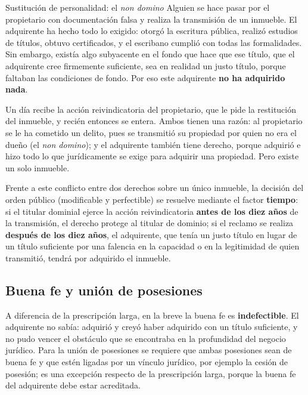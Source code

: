 \documentclass[12pt,oneside]{book}
\begin{document}
\begin{example}{Sustitución de personalidad: el \textit{non domino}}
Alguien se hace pasar por el propietario con documentación falsa y realiza la transmisión de un inmueble. El adquirente ha hecho todo lo exigido: otorgó la escritura pública, realizó estudios de títulos, obtuvo certificados, y el escribano cumplió con todas las formalidades. Sin embargo, existía algo subyacente en el fondo que hace que ese título, que el adquirente cree firmemente suficiente, sea en realidad un justo título, porque faltaban las condiciones de fondo. Por eso este adquirente \textbf{no ha adquirido nada}.

Un día recibe la acción reivindicatoria del propietario, que le pide la restitución del inmueble, y recién entonces se entera. Ambos tienen una razón: al propietario se le ha cometido un delito, pues se transmitió su propiedad por quien no era el dueño (el \textit{non domino}); y el adquirente también tiene derecho, porque adquirió e hizo todo lo que jurídicamente se exige para adquirir una propiedad. Pero existe un solo inmueble.
\end{example}

Frente a este conflicto entre dos derechos sobre un único inmueble, la decisión del orden público (modificable y perfectible) se resuelve mediante el factor \textbf{tiempo}: si el titular dominial ejerce la acción reivindicatoria \textbf{antes de los diez años} de la transmisión, el derecho protege al titular de dominio; si el reclamo se realiza \textbf{después de los diez años}, el adquirente, que tenía un justo título en lugar de un título suficiente por una falencia en la capacidad o en la legitimidad de quien transmitió, tendrá por adquirido el inmueble.

\subsection{Buena fe y unión de posesiones}

A diferencia de la prescripción larga, en la breve la buena fe es \textbf{indefectible}. El adquirente no sabía: adquirió y creyó haber adquirido con un título suficiente, y no pudo vencer el obstáculo que se encontraba en la profundidad del negocio jurídico. Para la unión de posesiones se requiere que ambas posesiones sean de buena fe y que estén ligadas por un vínculo jurídico, por ejemplo la cesión de posesión; es una excepción respecto de la prescripción larga, porque la buena fe del adquirente debe estar acreditada.
\end{document}
